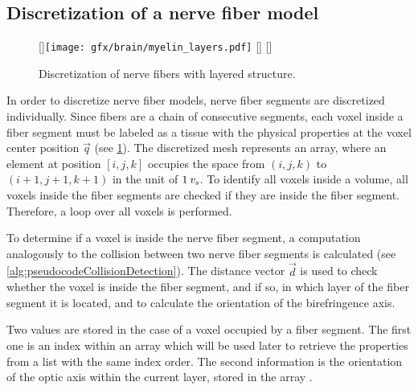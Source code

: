 \subsection{Discretization of a nerve fiber model}
%
\begin{figure}[!t]
\centering
\setlength{\tikzwidth}{0.3\textwidth}
[\tikzwidth]{\texttt{[image: gfx/brain/myelin\_layers.pdf]}\vspace{0mm}}\hfill
{}
[\tikzwidth]{\vspace{-5mm}}\hfill
{}
[\tikzwidth]{\vspace{-5mm}}
\caption[]{Discretization of nerve fibers with layered structure.}
\label{fig:fiber_discretization}
\end{figure}
%
In order to discretize nerve fiber models, nerve fiber segments are discretized individually.
Since fibers are a chain of consecutive segments, each voxel inside a fiber segment must be labeled as a tissue with the physical properties at the voxel center position $\vec{q}$ (see \cref{fig:fiber_discretization}).
The discretized mesh represents an array, where an element at position $[i,j,k]$ occupies the space from $(i,j,k)$ to $(i+1,j+1,k+1)$ in the unit of $\SI{1}{\textnormal{$\mathit{v_{s}}$}}$.
To identify all voxels inside a volume, all voxels inside the fiber segments are checked if they are inside the fiber segment.
Therefore, a loop over all voxels is performed.
\par
%
To determine if a voxel is inside the nerve fiber segment,
a computation analogously to the collision between two nerve fiber segments is calculated (see \cref{alg:pseudocodeCollisionDetection}).
The distance vector $\vec{d}$ is used to check whether the voxel is inside the fiber segment, and if so, in which layer of the fiber segment it is located, and to calculate the orientation of the birefringence axis.
\par
%
Two values are stored in the case of a voxel occupied by a fiber segment.
The first one is an index within an array  which will be used later to retrieve the properties from a list with the same index order.
The second information is the orientation of the optic axis within the current layer, stored in the array .
